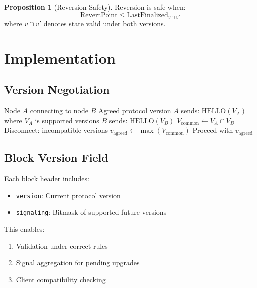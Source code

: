 \documentclass[11pt,a4paper]{article}
\theoremstyle{definition}
\newtheorem{proposition}[theorem]{Proposition}
\theoremstyle{remark}
\begin{document}
\begin{proposition}[Reversion Safety]
Reversion is safe when:
\begin{equation}
    \text{RevertPoint} \leq \text{LastFinalized}_{v \cap v'}
\end{equation}
where $v \cap v'$ denotes state valid under both versions.
\end{proposition}

\section{Implementation}

\subsection{Version Negotiation}

\begin{algorithm}
\caption{Version Negotiation Protocol}
\begin{algorithmic}[1]
\Require Node $A$ connecting to node $B$
\Ensure Agreed protocol version
\State $A$ sends: $\text{HELLO}(V_A)$ where $V_A$ is supported versions
\State $B$ sends: $\text{HELLO}(V_B)$
\State $V_{\text{common}} \gets V_A \cap V_B$
    \State Disconnect: incompatible versions
\EndIf
\State $v_{\text{agreed}} \gets \max(V_{\text{common}})$
\State Proceed with $v_{\text{agreed}}$
\end{algorithmic}
\end{algorithm}

\subsection{Block Version Field}

Each block header includes:
\begin{itemize}
    \item \texttt{version}: Current protocol version
    \item \texttt{signaling}: Bitmask of supported future versions
\end{itemize}

This enables:
\begin{enumerate}
    \item Validation under correct rules
    \item Signal aggregation for pending upgrades
    \item Client compatibility checking
\end{enumerate}
\end{document}
